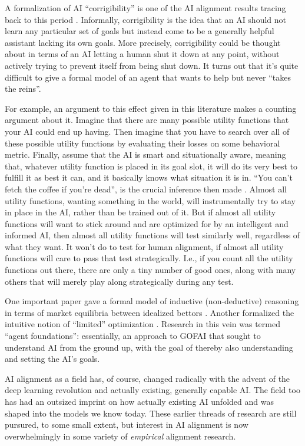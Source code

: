 A formalization of AI ``corrigibility'' is one of the AI alignment results
tracing back to this period \cite{soares2015corrigibility}. Informally,
corrigibility is the idea that an AI should not learn any particular set of
goals but instead come to be a generally helpful assistant lacking its own
goals. More precisely, corrigibility could be thought about in terms of an AI
letting a human shut it down at any point, without actively trying to prevent
itself from being shut down. It turns out that it's quite difficult to give a
formal model of an agent that wants to help but never ``takes the reins''.

For example, an argument to this effect given in this literature makes a
counting argument about it. Imagine that there are many possible utility
functions that your AI could end up having. Then imagine that you have to
search over all of these possible utility functions by evaluating their losses
on some behavioral metric. Finally, assume that the AI is smart and
situationally aware, meaning that, whatever utility function is placed in its
goal slot, it will do its very best to fulfill it as best it can, and it
basically knows what situation it is in. ``You can't fetch the coffee if you're
dead'', is the crucial inference then made \cite{russell2019human}. Almost all
utility functions, wanting something in the world, will instrumentally try to
stay in place in the AI, rather than be trained out of it. But if almost all
utility functions will want to stick around and are optimized for by an
intelligent and informed AI, then almost all utility functions will test
similarly well, regardless of what they want. It won't do to test for human
alignment, if almost all utility functions will care to pass that test
strategically. I.e., if you count all the utility functions out there, there
are only a tiny number of good ones, along with many others that will merely
play along strategically during any test.

One important paper gave a formal model of inductive (non-deductive) reasoning
in terms of market equilibria between idealized bettors
\cite{garrabrant2020induction}. Another formalized the intuitive notion of
``limited'' optimization \cite{taylor2016quantilizers}. Research in this vein
was termed ``agent foundations'': essentially, an approach to GOFAI that sought
to understand AI from the ground up, with the goal of thereby also
understanding and setting the AI's goals.

AI alignment as a field has, of course, changed radically with the advent of
the deep learning revolution and actually existing, generally capable AI. The
field too has had an outsized imprint on how actually existing AI unfolded and
was shaped into the models we know today. These earlier threads of research are
still pursured, to some small extent, but interest in AI alignment is now
overwhelmingly in some variety of \emph{empirical} alignment research.

